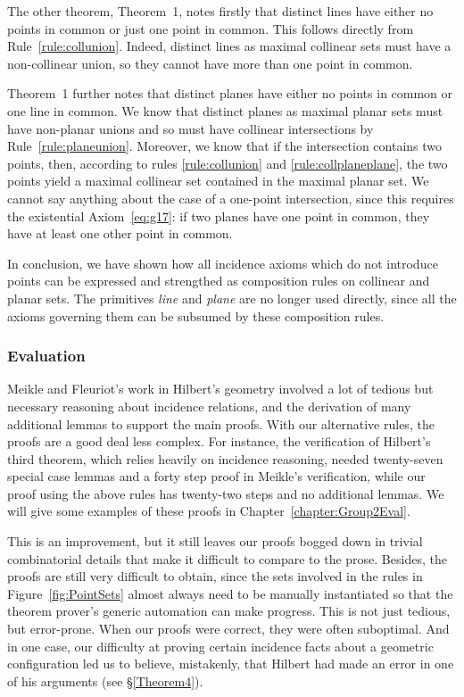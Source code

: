 The other theorem, Theorem~1, notes firstly that distinct lines have either no points in common or just one point in common. This follows directly from Rule~\ref{rule:collunion}. Indeed, distinct lines as maximal collinear sets must have a non-collinear union, so they cannot have more than one point in common. 

Theorem~1 further notes that distinct planes have either no points in common or one line in common. We know that distinct planes as maximal planar sets must have non-planar unions and so must have collinear intersections by Rule~\ref{rule:planeunion}. Moreover, we know that if the intersection contains two points, then, according to rules \ref{rule:collunion} and \ref{rule:collplaneplane}, the two points yield a maximal collinear set contained in the maximal planar set. We cannot say anything about the case of a one-point intersection, since this requires the existential Axiom~\ref{eq:g17}: if two planes have one point in common, they have at least one other point in common.

In conclusion, we have shown how all incidence axioms which do not introduce points can be expressed and strengthed as composition rules on collinear and planar sets. The primitives \emph{line} and \emph{plane} are no longer used directly, since all the axioms governing them can be subsumed by these composition rules. 

\subsubsection{Evaluation}
Meikle and Fleuriot's work in Hilbert's geometry involved a lot of tedious but necessary reasoning about incidence relations, and the derivation of many additional lemmas to support the main proofs. With our alternative rules, the proofs are a good deal less complex. For instance, the verification of Hilbert's third theorem, which relies heavily on incidence reasoning, needed twenty-seven special case lemmas and a forty step proof in Meikle's verification, while our proof using the above rules has twenty-two steps and no additional lemmas. We will give some examples of these proofs in Chapter~\ref{chapter:Group2Eval}.

This is an improvement, but it still leaves our proofs bogged down in trivial combinatorial details that make it difficult to compare to the prose. Besides, the proofs are still very difficult to obtain, since the sets involved in the rules in Figure~\ref{fig:PointSets} almost always need to be manually instantiated so that the theorem prover's generic automation can make progress. This is not just tedious, but error-prone. When our proofs were correct, they were often suboptimal. And in one case, our difficulty at proving certain incidence facts about a geometric configuration led us to believe, mistakenly, that Hilbert had made an error in one of his arguments (see \S\ref{Theorem4}).


